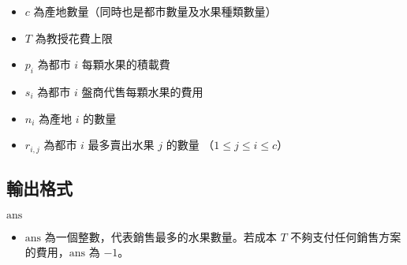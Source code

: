 \begin{itemize}
\tightlist
\item
  \begin{math}c\end{math} 為產地數量（同時也是都市數量及水果種類數量）
\item
  \begin{math}T\end{math} 為教授花費上限
\item
  \begin{math}p_i\end{math} 為都市 \begin{math}i\end{math}
  每顆水果的積載費
\item
  \begin{math}s_i\end{math} 為都市 \begin{math}i\end{math}
  盤商代售每顆水果的費用
\item
  \begin{math}n_i\end{math} 為產地 \begin{math}i\end{math} 的數量
\item
  \begin{math}r_{i,j}\end{math} 為都市 \begin{math}i\end{math}
  最多賣出水果 \begin{math}j\end{math} 的數量
  （\begin{math}1 \le j \le i \le c\end{math}）
\end{itemize}

\subsection{輸出格式}

\begin{format}
\f{
$\textrm{ans}$
}
\end{format}

\begin{itemize}
\tightlist
\item
  \begin{math}\textrm{ans}\end{math}
  為一個整數，代表銷售最多的水果數量。若成本 \begin{math}T\end{math}
  不夠支付任何銷售方案的費用，\begin{math}\textrm{ans}\end{math} 為
  \begin{math}-1\end{math}。
\end{itemize}

